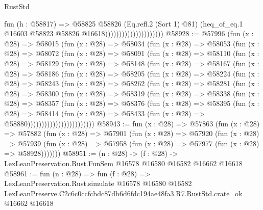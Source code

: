 \begin{lexlean}{RustStd}
\begin{coremodule}
                                          fun (h : @58817) =>
                                          @58825
                                            @58826
                                            (Eq.refl.{2} (Sort 1) @81)
                                            (heq_of_eq.{1}
                                              @16603
                                              @58823
                                              @58826
                                              @16618)))))))))))))))))))))
@58928 := @57996
    (fun (x : @28) =>
    @58015
      (fun (x : @28) =>
      @58034
        (fun (x : @28) =>
        @58053
          (fun (x : @28) =>
          @58072
            (fun (x : @28) =>
            @58091
              (fun (x : @28) =>
              @58110
                (fun (x : @28) =>
                @58129
                  (fun (x : @28) =>
                  @58148
                    (fun (x : @28) =>
                    @58167
                      (fun (x : @28) =>
                      @58186
                        (fun (x : @28) =>
                        @58205
                          (fun (x : @28) =>
                          @58224
                            (fun (x : @28) =>
                            @58243
                              (fun (x : @28) =>
                              @58262
                                (fun (x : @28) =>
                                @58281
                                  (fun (x : @28) =>
                                  @58300
                                    (fun (x : @28) =>
                                    @58319
                                      (fun (x : @28) =>
                                      @58338
                                        (fun (x : @28) =>
                                        @58357
                                          (fun (x : @28) =>
                                          @58376
                                            (fun (x : @28) =>
                                            @58395
                                              (fun (x : @28) =>
                                              @58414
                                                (fun (x : @28) =>
                                                @58433
                                                  (fun (x : @28) => @58880))))))))))))))))))))))))
@58943 := fun (x : @28) =>
  @57863
    (fun (x : @28) =>
    @57882
      (fun (x : @28) =>
      @57901
        (fun (x : @28) =>
        @57920
          (fun (x : @28) =>
          @57939 (fun (x : @28) => @57958 (fun (x : @28) => @57977 (fun (x : @28) => @58928)))))))
@58951 := (n : @28) ->
  (f : @28) -> LexLeanPreservation.Rust.FunSem @16578 @16580 @16582 @16662 @16618
@58961 := fun (n : @28) =>
  fun (f : @28) =>
  LexLeanPreservation.Rust.simulate
    @16578
    @16580
    @16582
    LexLeanPreserve.C2c6c0ccfcbdc87db6d6fdc194ae48fa3.R7.RustStd.crate_ok
    @16662
    @16618
\end{coremodule}
\end{lexlean}
